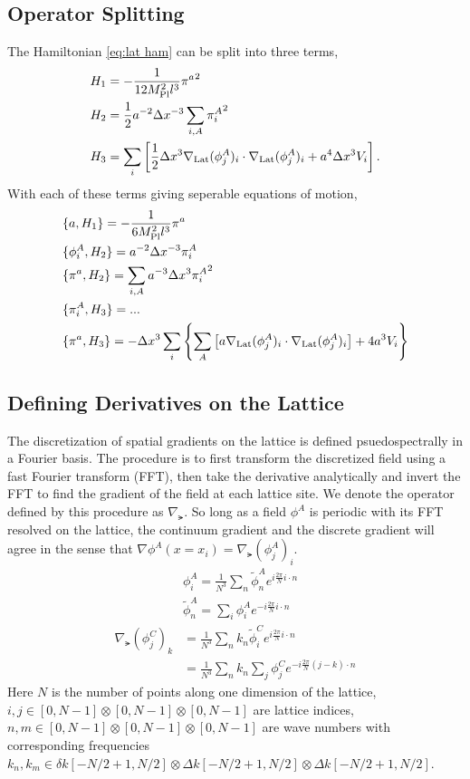 \subsection{Operator Splitting}
The Hamiltonian \eqref{eq:lat ham} can be split into three terms,
\begin{align} \label{eq:lat ham split}
  & H_1 = -\frac{1}{12M_{\mathrm{Pl}}^2l^3}{\pi^a}^2  \\
  & H_2 = \frac{1}{2}a^{-2}\Delta x^{-3}\sum_{i,A} {\pi^A_i}^2  \\
  & H_3 = \sum_i\left[\frac{1}{2}\Delta x^3\nabla_{\mathrm{Lat}}(\phi^A_j)_i\cdot\nabla_{\mathrm{Lat}}(\phi^A_j)_i + a^4\Delta x^3V_i\right].
\end{align}
With each of these terms giving seperable equations of motion,
\begin{align}
  & \{a,H_1\} = -\frac{1}{6M_{\mathrm{Pl}}^2l^3}\pi^a \\
  & \{\phi^A_i,H_2\} = a^{-2}\Delta x^{-3}\pi^A_i \\
  & \{\pi^a,H_2\} = \sum_{i,A}a^{-3}\Delta x^3{\pi^A_i}^2 \\
  & \{\pi^A_i,H_3\} = ... \\
  & \{\pi^a,H_3\} = -\Delta x^3\sum_i\left\{\sum_A\left[a\nabla_{\mathrm{Lat}}(\phi^A_j)_i\cdot\nabla_{\mathrm{Lat}}(\phi^A_j)_i\right] + 4a^3V_i \right\}
\end{align}

\subsection{Defining Derivatives on the Lattice}
The discretization of spatial gradients on the lattice is defined psuedospectrally in a Fourier basis.
The procedure is to first transform the discretized field using a fast Fourier transform (FFT), then take the derivative analytically and invert the FFT to find the gradient of the field at each lattice site.
We denote the operator defined by this procedure as $\nabla_\lat$.
So long as a field $\phi^A$ is periodic with its FFT resolved on the lattice, the continuum gradient and the discrete gradient will agree in the sense that $\nabla\phi^A(x=x_i) = \nabla_\lat(\phi^A_j)_i$.
\begin{align}
  &\phi^A_i = \frac{1}{N^3}\sum_n\tilde{\phi}^A_n e^{i\frac{2\pi}{N}i\cdot n} \\
  &\tilde{\phi}^A_n = \sum_i\phi^A_i e^{-i\frac{2\pi}{N}i\cdot n} 
\end{align}
\begin{align}
  \nabla_\lat(\phi^C_j)_k &= \frac{1}{N^3}\sum_n k_n \tilde{\phi}^C_i e^{i\frac{2\pi}{N}i\cdot n}\\
  & = \frac{1}{N^3}\sum_n k_n \sum_j\phi^C_j e^{-i\frac{2\pi}{N}(j-k)\cdot n}
\end{align}
Here $N$ is the number of points along one dimension of the lattice, $i,j \in [0,N-1]\otimes[0,N-1]\otimes[0,N-1]$ are lattice indices,  $n,m \in [0,N-1]\otimes[0,N-1]\otimes[0,N-1]$ are wave numbers with corresponding frequencies $k_n,k_m \in \delta k [-N/2+1,N/2] \otimes \Delta k [-N/2+1,N/2] \otimes \Delta k [-N/2+1,N/2]$.

